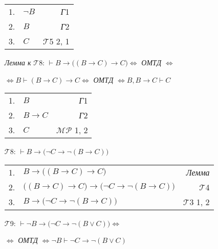 \documentclass{article}
\begin{document}
\begin{enumerate}
\begin{tabular}{llr}
1. & $\neg B$ & \textit{Г}1\\
2. & $B$ & \textit{Г}2\\
3. & $C$ & $\mathcal{T}$5 2, 1
\end{tabular}
\item[\textit{Лемма к }$\mathcal{T}$8:] $\vdash B\rightarrow\bigl(\left(B\rightarrow C\right)\rightarrow C\bigr)\Leftrightarrow$ \textit{ОМТД} $\Leftrightarrow$

$\Leftrightarrow B\vdash\left(B\rightarrow C\right)\rightarrow C\Leftrightarrow$ \textit{ОМТД} $\Leftrightarrow B, B\rightarrow C\vdash C$

\begin{tabular}{llr}
1. & $B$ & \textit{Г}1\\
2. & $B\rightarrow C$ & \textit{Г}2\\
3. & $C$ & $\mathcal{MP}$ 1, 2
\end{tabular}

\item[$\mathcal{T}$8:] $\vdash B\rightarrow\bigl(\neg C\rightarrow\neg\left(B\rightarrow C\right)\bigr)$

\begin{tabular}{llr}
1. & $B\rightarrow\bigl(\left(B\rightarrow C\right)\rightarrow C\bigr)$ & \textit{Лемма}\\
2. & $\bigl(\left(B\rightarrow C\right)\rightarrow C\bigr)\rightarrow\bigl(\neg C\rightarrow\neg\left(B\rightarrow C\right)\bigr)$ & $\mathcal{T}$4\\
3. & $B\rightarrow\bigl(\neg C\rightarrow\neg\left(B\rightarrow C\right)\bigr)$ & $\mathcal{T}$3 1, 2
\end{tabular}
\item[$\mathcal{T}$9:] $\vdash\neg B\rightarrow\bigl(\neg C\rightarrow\neg\left(B\lor C\right)\bigr)\Leftrightarrow$

$\Leftrightarrow$ \textit{ОМТД} $\Leftrightarrow \neg B\vdash\neg C\rightarrow\neg\left(B\lor C\right)$


\end{enumerate}
\end{document}
